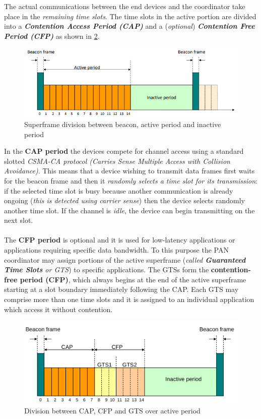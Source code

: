\documentclass[10pt,a4paper]{report}
\theoremstyle{definition}
\begin{document}
The actual communications between the end devices and the coordinator take place in the \textit{remaining time slots}. The time slots in the active portion are divided into a \textit{\textbf{Contention Access Period (CAP)}} and a (\textit{optional}) \textit{\textbf{Contention Free Period (CFP)}} as shown in \ref{gts-cfp-periods}.

\begin{figure}[h]
	\centering\includegraphics[scale=0.50]{images/Pasted image 20230409102712.png}

	\caption{Superframe division between beacon, active period and inactive period}
	\label{superframe-general}
\end{figure}
In the \textbf{CAP period} the devices compete for channel access using a standard slotted \textit{CSMA-CA protocol (Carries Sense Multiple Access with Collision Avoidance)}.  This means that a device wishing to transmit data frames first waits for the beacon frame and then it \textit{randomly selects a time slot for its transmission}: if the selected time slot is busy because another communication is already ongoing (\textit{this is detected using carrier sense}) then the device selects randomly another time slot. If the channel is \textit{idle}, the device can begin transmitting on the next slot.\\\\
The \textbf{CFP period} is optional and it is used for low-latency applications or applications requiring specific data bandwidth. To this purpose the PAN coordinator may assign portions of the active superframe (\textit{called \textbf{Guaranteed Time Slots} or GTS}) to specific applications. The GTSs form the \textbf{contention-free period (CFP)}, which always begins at the end of the active superframe starting at a slot boundary immediately following the CAP. Each GTS may comprise more than one time slots and it is assigned to an individual application which access it without contention.
\begin{figure}[h]
	\centering\includegraphics[scale=0.60]{images/Pasted image 20230409103442.png}
	\caption{Division between CAP, CFP and GTS over active period}
	\label{gts-cfp-periods}
\end{figure}
\end{document}
